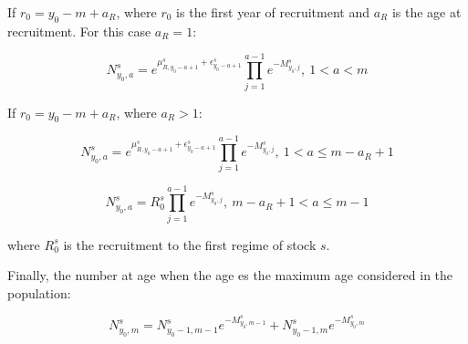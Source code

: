 \documentclass{article}
\begin{document}
If $r_0 = y_0-m+a_R$, where $r_0$ is the first year of recruitment and $a_R$ is the age at recruitment. For this case $a_R=1$:

\begin{equation}
N^s_{y_0,a}=e^{\mu_{R,y_0-a+1}^s + \epsilon^s_{y_0-a+1}}
            \prod_{j=1}^{a-1}e^{-M^s_{y_0,j}}, \ 1<a<m
\end{equation}

If $r_0 = y_0-m+a_R$, where $a_R>1$:

\begin{equation}
N^s_{y_0,a}=e^{\mu_{R,y_0-a+1}^s + \epsilon^s_{y_0-a+1}}                          \prod_{j=1}^{a-1}e^{-M^s_{y_0,j}}, \ 1<a\leq m-a_R+1
\end{equation}

\begin{equation}
N^s_{y_0,a}=R_0^s\prod_{j=1}^{a-1}e^{-M^s_{y_0,j}}, \ m-a_R+1<a\leq m-1
\end{equation}

where $R_0^s$ is the recruitment to the first regime of stock $s$.

Finally, the number at age when the age es the maximum age considered in the population:

\begin{equation}
N^s_{y_0,m}=N^s_{y_0-1,m-1}e^{-M^s_{y_0,m-1}}+N^s_{y_0-1,m}e^{-M^s_{y_0,m}}
\end{equation}




\newpage
\end{document}
